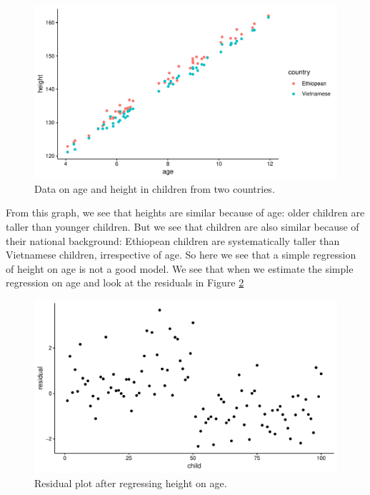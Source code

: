 \documentclass[]{book}\usepackage[]{graphicx}\usepackage[]{color}
\makeatletter
\def\maxwidth{ %
  \ifdim\Gin@nat@width>\linewidth
    \linewidth
  \else
    \Gin@nat@width
  \fi
}
\newenvironment{knitrout}{}{} %
\makeatother
\begin{document}
\begin{knitrout}
\color{fgcolor}\begin{figure}

{\centering \includegraphics[width=\maxwidth]{figure/ass_5-1} 

}

\caption[Data on age and height in children from two countries]{Data on age and height in children from two countries.}\label{fig:ass_5}
\end{figure}


\end{knitrout}

From this graph, we see that heights are similar because of age: older children are taller than younger children. But we see that children are also similar because of their national background: Ethiopean children are systematically taller than Vietnamese children, irrespective of age. So here we see that a simple regression of height on age is not a good model. We see that when we estimate the simple regression on age and look at the residuals in Figure \ref{fig:ass_6}

\begin{knitrout}
\color{fgcolor}\begin{figure}

{\centering \includegraphics[width=\maxwidth]{figure/ass_6-1} 

}

\caption[Residual plot after regressing height on age]{Residual plot after regressing height on age.}\label{fig:ass_6}
\end{figure}


\end{knitrout}
\end{document}
